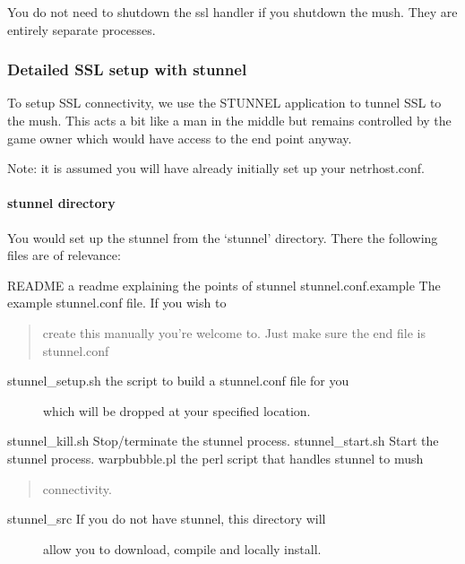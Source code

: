 \documentclass[letterpaper,10pt,english]{sphinxmanual}
\begin{document}
\sphinxAtStartPar
You do not need to shutdown the ssl handler if you shutdown the mush.  They
are entirely separate processes.


\subsubsection{Detailed SSL setup with stunnel}
\label{\detokenize{security:detailed-ssl-setup-with-stunnel}}
\sphinxAtStartPar
To setup SSL connectivity, we use the STUNNEL application to tunnel SSL to
the mush.  This acts a bit like a man in the middle but remains controlled
by the game owner which would have access to the end point anyway.

\sphinxAtStartPar
Note: it is assumed you will have already initially set up your netrhost.conf.


\paragraph{stunnel directory}
\label{\detokenize{security:stunnel-directory}}
\sphinxAtStartPar
You would set up the stunnel from the ‘stunnel’ directory.  There the following
files are of relevance:

\sphinxAtStartPar
README                     \textendash{} a readme explaining the points of stunnel
stunnel.conf.example       \textendash{} The example stunnel.conf file.  If you wish to
\begin{quote}

\sphinxAtStartPar
create this manually you’re welcome to.  Just
make sure the end file is stunnel.conf
\end{quote}
\begin{description}
\item[{stunnel\_setup.sh           \textendash{} the script to build a stunnel.conf file for you}] \leavevmode
\sphinxAtStartPar
which will be dropped at your specified location.

\end{description}

\sphinxAtStartPar
stunnel\_kill.sh            \textendash{} Stop/terminate the stunnel process.
stunnel\_start.sh           \textendash{} Start the stunnel process.
warpbubble.pl              \textendash{} the perl script that handles stunnel to mush
\begin{quote}

\sphinxAtStartPar
connectivity.
\end{quote}
\begin{description}
\item[{stunnel\_src                \textendash{} If you do not have stunnel, this directory will}] \leavevmode
\sphinxAtStartPar
allow you to download, compile and locally install.

\end{description}
\end{document}
